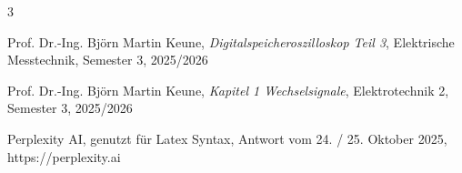\documentclass[12pt, a4paper, titlepage]{article}
\begin{document}
\newpage


\begin{thebibliography}{3}

		Prof. Dr.-Ing. Björn Martin Keune, \textit{Digitalspeicheroszilloskop Teil 3}, Elektrische Messtechnik, Semester 3, 2025/2026


		Prof. Dr.-Ing. Björn Martin Keune, \textit{Kapitel 1 Wechselsignale}, Elektrotechnik 2, Semester 3, 2025/2026
	
		Perplexity AI, genutzt für Latex Syntax, Antwort vom 24. / 25. Oktober 2025, https://perplexity.ai


\end{thebibliography}
\end{document}
